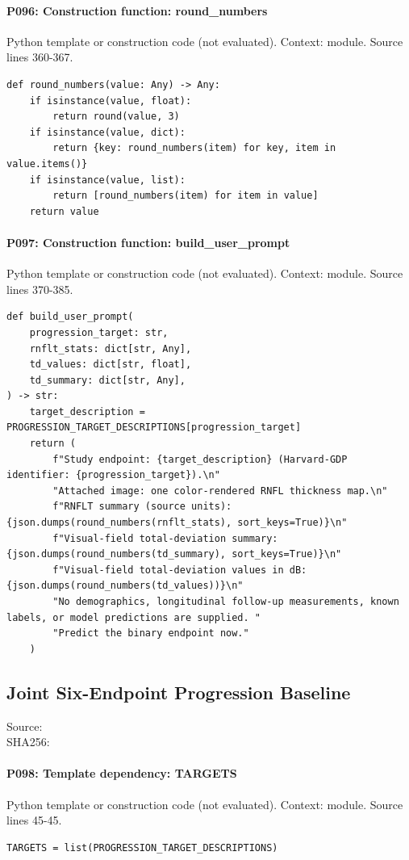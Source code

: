 \documentclass[10pt]{article}
\begin{document}
\paragraph{P096: Construction function: round\_numbers}
Python template or construction code (not evaluated). Context: module. Source lines 360-367.
\begin{Verbatim}
def round_numbers(value: Any) -> Any:
    if isinstance(value, float):
        return round(value, 3)
    if isinstance(value, dict):
        return {key: round_numbers(item) for key, item in value.items()}
    if isinstance(value, list):
        return [round_numbers(item) for item in value]
    return value
\end{Verbatim}
\paragraph{P097: Construction function: build\_user\_prompt}
Python template or construction code (not evaluated). Context: module. Source lines 370-385.
\begin{Verbatim}
def build_user_prompt(
    progression_target: str,
    rnflt_stats: dict[str, Any],
    td_values: dict[str, float],
    td_summary: dict[str, Any],
) -> str:
    target_description = PROGRESSION_TARGET_DESCRIPTIONS[progression_target]
    return (
        f"Study endpoint: {target_description} (Harvard-GDP identifier: {progression_target}).\n"
        "Attached image: one color-rendered RNFL thickness map.\n"
        f"RNFLT summary (source units): {json.dumps(round_numbers(rnflt_stats), sort_keys=True)}\n"
        f"Visual-field total-deviation summary: {json.dumps(round_numbers(td_summary), sort_keys=True)}\n"
        f"Visual-field total-deviation values in dB: {json.dumps(round_numbers(td_values))}\n"
        "No demographics, longitudinal follow-up measurements, known labels, or model predictions are supplied. "
        "Predict the binary endpoint now."
    )
\end{Verbatim}
\subsection{Joint Six-Endpoint Progression Baseline}
Source: \\
SHA256: {\scriptsize{}}
\paragraph{P098: Template dependency: TARGETS}
Python template or construction code (not evaluated). Context: module. Source lines 45-45.
\begin{Verbatim}
TARGETS = list(PROGRESSION_TARGET_DESCRIPTIONS)
\end{Verbatim}
\end{document}

